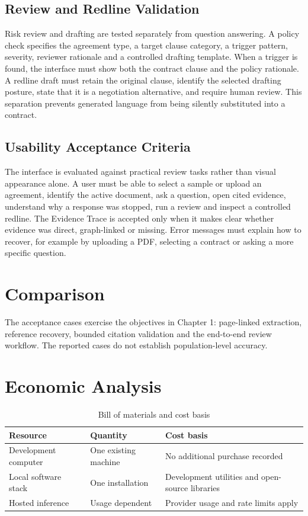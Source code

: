 \documentclass[12pt,a4paper,oneside]{report}
\begin{document}
\subsection{Review and Redline Validation}
Risk review and drafting are tested separately from question answering. A policy check specifies the agreement type, a target clause category, a trigger pattern, severity, reviewer rationale and a controlled drafting template. When a trigger is found, the interface must show both the contract clause and the policy rationale. A redline draft must retain the original clause, identify the selected drafting posture, state that it is a negotiation alternative, and require human review. This separation prevents generated language from being silently substituted into a contract.

\subsection{Usability Acceptance Criteria}
The interface is evaluated against practical review tasks rather than visual appearance alone. A user must be able to select a sample or upload an agreement, identify the active document, ask a question, open cited evidence, understand why a response was stopped, run a review and inspect a controlled redline. The Evidence Trace is accepted only when it makes clear whether evidence was direct, graph-linked or missing. Error messages must explain how to recover, for example by uploading a PDF, selecting a contract or asking a more specific question.

\section{Comparison}
The acceptance cases exercise the objectives in Chapter 1: page-linked extraction, reference recovery, bounded citation validation and the end-to-end review workflow. The reported cases do not establish population-level accuracy.

\section{Economic Analysis}
\begin{table}[H]
\centering
\begin{tabularx}{\textwidth}{lXX}
\toprule
Resource & Quantity & Cost basis\\ \midrule
Development computer & One existing machine & No additional purchase recorded\\
Local software stack & One installation & Development utilities and open-source libraries\\
Hosted inference & Usage dependent & Provider usage and rate limits apply\\
\bottomrule
\end{tabularx}
\caption{Bill of materials and cost basis}
\end{table}
\end{document}
